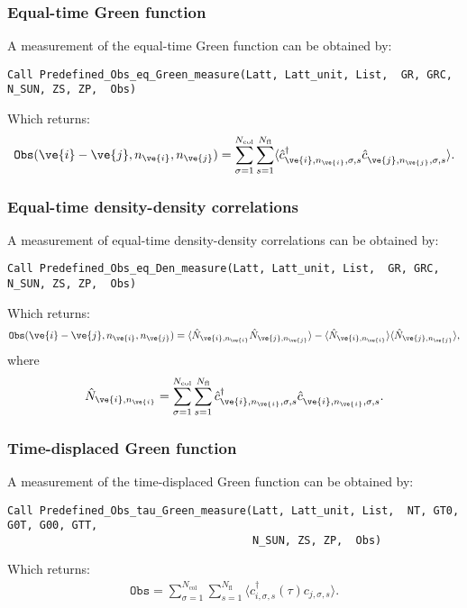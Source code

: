 \subsubsection{Equal-time Green function}

A measurement of the equal-time Green function can be obtained by:
\begin{lstlisting}[style=fortran]
Call Predefined_Obs_eq_Green_measure(Latt, Latt_unit, List,  GR, GRC, N_SUN, ZS, ZP,  Obs)
\end{lstlisting}

Which returns:
\begin{align}
\texttt{Obs}(\ve{i}-\ve{j}, n_{\ve{i}}, n_{\ve{j}}) = \sum_{\sigma=1}^{N_\text{col}} \sum_{s=1}^{N_\text{fl}} \langle  \hat{c}^{\dagger}_{\ve{i}, n_{\ve{i}},\sigma,s} \hat{c}^{\phantom\dagger}_{\ve{j}, n_{\ve{j}},\sigma,s} \rangle.
\end{align}


\subsubsection{Equal-time density-density correlations}

A measurement of equal-time density-density correlations can be obtained by:
\begin{lstlisting}[style=fortran]
Call Predefined_Obs_eq_Den_measure(Latt, Latt_unit, List,  GR, GRC, N_SUN, ZS, ZP,  Obs)
\end{lstlisting}
Which returns:
\begin{align}
\texttt{Obs}(\ve{i}-\ve{j}, n_{\ve{i}}, n_{\ve{j}}) = \langle\hat{ N}_{\ve{i},n_{\ve{i}}}  \hat{N}_{\ve{j},n_{\ve{j}}}\rangle - \langle \hat{N}_{\ve{i},n_{\ve{i}}} \rangle  \langle \hat{N}_{\ve{j},n_{\ve{j}}}\rangle,
\end{align}
where
\begin{align}
\hat{N}_{\ve{i},n_{\ve{i}}}  = \sum_{\sigma=1}^{N_\text{col}} \sum_{s=1}^{N_\text{fl}}  \hat{c}^{\dagger}_{\ve{i},n_{\ve{i}},\sigma,s} \hat{c}^{\phantom\dagger}_{\ve{i}, n_{\ve{i}},\sigma,s}.
\end{align}


\subsubsection{Time-displaced Green function}

A measurement of the time-displaced Green function can be obtained by:
\begin{lstlisting}[style=fortran]
Call Predefined_Obs_tau_Green_measure(Latt, Latt_unit, List,  NT, GT0, G0T, G00, GTT, 
                                      N_SUN, ZS, ZP,  Obs)
\end{lstlisting}
Which returns:
\begin{align}
\texttt{Obs} = \sum_{\sigma=1}^{N_\text{col}} \sum_{s=1}^{N_\text{fl}} \langle  c^{\dagger}_{i,\sigma,s}(\tau) c_{j,\sigma,s} \rangle.
\end{align}


